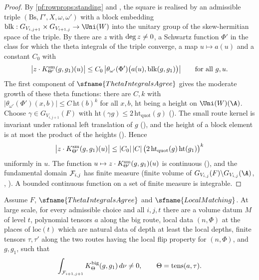 \begin{proof}
By \cref{pf:rowprops:standing} and , the square is
realised by an admissible triple $(\mathrm{Bs},\Gamma',X,\omega,\omega')$ with a block embedding
$\mathrm{blk}:G_{V_{i,j+1}}\times G_{V_{i+1,j}}\to\Uni(W)$ into the unitary group of the skew-hermitian space of the triple.
By  there are $z$ with $\deg z\ne0$, a
Schwartz function $\Phi'$ in the class for which the theta integrals of the triple converge, a map $u\mapsto a(u)$ and a
constant $C_0$ with
\[
\bigl|z\cdot K^{\mathrm{sm}}_{\Theta'}(g,g_1)(u)\bigr|\le C_0\,\bigl|\theta_{\omega'}(\Phi')\bigl(a(u),\mathrm{blk}(g,g_1)\bigr)\bigr|
\qquad\text{for all }g,u .
\]
The first component of $\sfname{ThetaIntegralsAgree}$ gives the moderate growth of these theta functions: there are $C,k$
with $|\theta_{\omega'}(\Phi')(x,b)|\le C\,\mathrm{ht}(b)^k$ for all $x,b$, $\mathrm{ht}$ being a height on $\Uni(W)(\A)$.
Choose $\gamma\in G_{V_{i,j+1}}(F)$ with $\mathrm{ht}(\gamma g)\le 2\,\mathrm{ht}_{\mathrm{quot}}(g)$
(). The small route kernel is invariant under rational
left translation of $g$ (), and the height of a block element is at
most the product of the heights (). Hence
\[
\bigl|z\cdot K^{\mathrm{sm}}_{\Theta'}(g,g_1)(u)\bigr|\le |C_0|\,|C|\,\bigl(2\,\mathrm{ht}_{\mathrm{quot}}(g)\,\mathrm{ht}(g_1)\bigr)^k
\]
uniformly in $u$. The function $u\mapsto z\cdot K^{\mathrm{sm}}_{\Theta'}(g,g_1)(u)$ is continuous
(), and the fundamental domain $\mathcal{F}_{i,j}$ has
finite measure (finite volume of $G_{V_{i,j}}(F)\backslash G_{V_{i,j}}(\A)$, ,
\cite{Borel1963}). A bounded continuous function on a set of finite measure is integrable.
\end{proof}

\begin{lemma}\label{pf:rowprops:bignz}
Assume $F$, $\sfname{ThetaIntegralsAgree}$ and $\sfname{LocalMatching}$. At large scale, for every admissible choice and
all $i,j,t$ there are a volume datum $M$ of level $t$, polynomial tensors $a$ along the big route, local data $(n,\Phi)$
at the places of $\mathrm{loc}(t)$ which are natural data of depth at least the local depths, finite tensors
$\tau,\tau'$ along the two routes having the local flip property for $(n,\Phi)$, and $g,g_1$, such that
\[
\int_{\mathcal{F}_{i+1,j+1}}K^{\mathrm{big}}_{\Theta}(g,g_1)\,d\nu\ne0,\qquad \Theta=\mathrm{tens}(a,\tau).
\]
\end{lemma}

